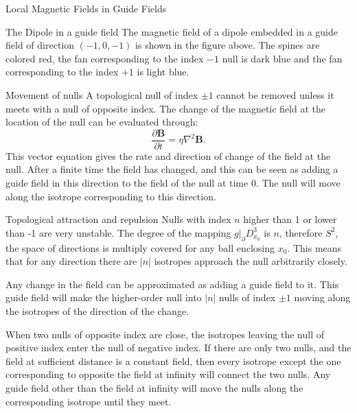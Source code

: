 \documentclass[final]{beamer}
\newlength{\onecolwid}
\begin{document}
\begin{frame}[t]
\begin{columns}[t]
\begin{column}{\onecolwid}
\begin{block}{\huge{Local Magnetic Fields in Guide Fields}}
\begin{block}{The Dipole in a guide field}
    The magnetic field of a dipole embedded in a guide field of direction $(-1,0,-1)$ is
    shown in the figure above. 
    The spines are colored red, the fan corresponding to the
    index $-1$ null is dark blue and the fan corresponding to the
    index $+1$ is light blue. 


\end{block}


\begin{block}{Movement of nulls}
    A topological null of index $\pm 1$ cannot be removed unless it meets with a null of opposite index. 
    The change of the magnetic field at the location of the null can be evaluated through:
    \begin{equation}
        \frac{\partial \mathbf{B}}{\partial t} = \eta \nabla^2 \mathbf{B}.
    \end{equation}
    This vector equation gives the rate and direction of change of the field at the null.
    After a finite time the field has changed, and this can be seen as adding a guide
    field in this direction to the field of the null at time 0. 
    The null will move along the isotrope corresponding to this direction.

\end{block}


\begin{block}{Topological attraction and repulsion}
    Nulls with index $n$ higher than 1 or lower than -1 are very unstable.  The degree of
    the mapping $g|_\partial D^3_{x_0}$ is $n$, therefore $S^2$, the space of
    directions is multiply covered for any ball enclosing $x_0$. 
    This means that for any direction there are $|n|$ isotropes approach the null arbitrarily
    closely. 

    Any change in the field can be approximated as 
    adding a guide field to it. 
    This guide field will make the higher-order null into $|n|$ nulls of index $\pm 1$ moving along the
    isotropes of the direction of the change. 

    When two nulls of opposite index are close, the isotropes leaving the null of positive
    index enter the null of negative index. 
    If there are only two nulls, and the field at sufficient distance is a constant field,
    then every isotrope except the one corresponding to opposite the field at infinity
    will connect the two nulls. 
    Any guide field other than the field at infinity will move the nulls along the
    corresponding isotrope until they meet. 
\end{block}


\end{block}
\end{column}
\end{columns}
\end{frame}
\end{document}
